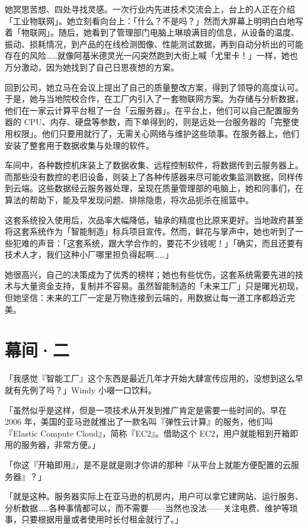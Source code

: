 她冥思苦想、四处寻找灵感。一次行业内先进技术交流会上，台上的人正在介绍「工业物联网」。她立刻看向台上：「什么？不是吗？」然而大屏幕上明明白白地写着「物联网」。随后，她看到了管理部门电脑上琳琅满目的信息，从设备的温度、振动、损耗情况，到产品的在线检测图像、性能测试数据，再到自动分析出的可能存在的风险……就像阿基米德灵光一闪突然跑到大街上喊「尤里卡！」一样，她也万分激动，因为她找到了自己日思夜想的方案。

回到公司，她立马在会议上提出了自己的质量整改方案，得到了领导的高度认可。于是，她与当地院校合作，在工厂内引入了一套物联网方案。为存储与分析数据，他们在一家云计算平台租了一台「云服务器」。在平台上，他们可以自己配置服务器的 CPU、内存、硬盘等参数，而下单得到的，则是远处一台服务器的「完整使用权限」。他们只要用就行了，无需关心网络与维护这些琐事。在服务器上，他们安装了整套用于数据收集与处理的软件。

车间中，各种数控机床装上了数据收集、远程控制软件，将数据传到云服务器上。而那些没有数控的老旧设备，则装上了各种传感器来尽可能收集监测数据，同样传到云端。这些数据经云服务器处理，呈现在质量管理部的电脑上，她和同事们，在算法的帮助下，能及早发现问题、排除隐患，将次品扼杀在摇篮中。

这套系统投入使用后，次品率大幅降低，轴承的精度也比原来更好。当地政府甚至将这套系统作为「智能制造」标兵项目宣传。然而，鲜花与掌声中，她也听到了一些犯难的声音：「这套系统，跟大学合作的，要花不少钱呢！」「确实，而且还要有技术人才，我们这种小厂哪里担负得起啊……」

她很高兴，自己的决策成为了优秀的榜样；她也有些忧伤，这套系统需要先进的技术与大量资金支持，复制并不容易。虽然智能制造的「未来工厂」只是曙光初现，但她坚信：未来的工厂一定是万物连接到云端的，用数据让每一道工序都趋近完美。

\section{幕间·二}

「我感觉『智能工厂』这个东西是最近几年才开始大肆宣传应用的，没想到这么早就有先例了吗？」Windy 小啜一口饮料。

「虽然似乎是这样，但是一项技术从开发到推广肯定是需要一些时间的。早在 2006 年，美国的亚马逊就推出了一款名叫『弹性云计算』的服务，他们叫『Elastic Compute Cloud』，简称『EC2』。借助这个 EC2，用户就能租到开箱即用的服务器，非常方便。」

「你这『开箱即用』，是不是就是刚才你讲的那种『从平台上就能方便配置的云服务器』？」

「就是这种。服务器实际上在亚马逊的机房内，用户可以拿它建网站、运行服务、分析数据……各种事情都可以，而不需要——当然也没法——关注电费、维护等琐事，只要根据用量或者使用时长付租金就行了。」

